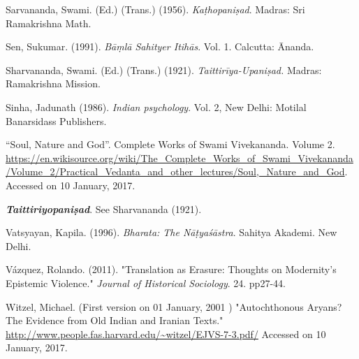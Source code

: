 \begin{thebibliography}{99}
Sarvananda, Swami. (Ed.) (Trans.) (1956). \textsl{Kaṭhopaniṣad}. Madras: Sri Ramakrishna Math.

Sen, Sukumar. (1991). \textsl{Bāṃlā Sahityer Itihās}. Vol. 1. Calcutta: Ānanda. 

Sharvananda, Swami. (Ed.) (Trans.) (1921). \textsl{Taittirīya-Upaniṣad.} Madras: Ramakrishna Mission.

Sinha, Jadunath (1986). \textsl{Indian psychology}. Vol. 2, New Delhi: Motilal Banarsidass Publishers.

“Soul, Nature and God”. Complete Works of Swami Vivekananda. Volume 2. \url{https://en.wikisource.org/wiki/The_Complete_Works_of_Swami_Vivekananda/Volume_2/Practical_Vedanta_and_other_lectures/Soul,_Nature_and_God}. Accessed on 10 January, 2017. 

{\sl\bfseries Taittiriyopaniṣad}. See Sharvananda (1921).

Vatsyayan, Kapila. (1996). \textsl{Bharata: The Nāṭyaśāstra}. Sahitya Akademi. New Delhi. 

Vázquez, Rolando. (2011). "Translation as Erasure: Thoughts on Modernity's Epistemic Violence." \textsl{Journal of Historical Sociology}. 24. pp27-44.

Witzel, Michael. (First version on 01 January, 2001 ) "Autochthonous Aryans? The Evidence from Old Indian and Iranian Texts." \url{http://www.people.fas.harvard.edu/~witzel/EJVS-7-3.pdf/} Accessed on 10 January, 2017. 
\end{thebibliography}
